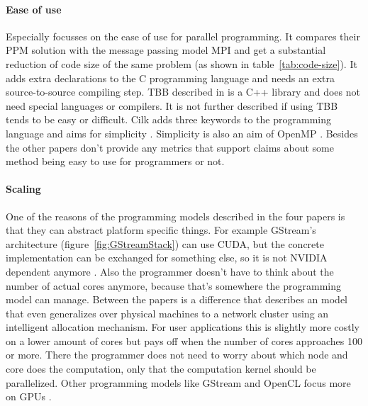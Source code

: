 \paragraph{Ease of use} Especially \cite{BrightwellParallelPhaseModel} focusses
on the ease of use for parallel programming. It compares their PPM solution
with the message passing model MPI and get a substantial reduction of code size
of the same problem (as shown in table~\ref{tab:code-size}). It adds extra
declarations to the C programming language and needs an extra source-to-source
compiling step. TBB described in
\cite{KimExploitingMultiManyCore,CaoPerformanceAnalysis} is a C++ library and
does not need special languages or compilers. It is not further described if
using TBB tends to be easy or difficult. Cilk adds three keywords to the
programming language and aims for simplicity \cite{KimExploitingMultiManyCore}.
Simplicity is also an aim of OpenMP \cite{KimExploitingMultiManyCore}. Besides
\cite{BrightwellParallelPhaseModel} the other papers don't provide any metrics
that support claims about some method being easy to use for programmers or not.

\paragraph{Scaling} One of the reasons of the programming models
described in the four papers is that they can abstract platform specific
things. For example GStream's architecture (figure~\ref{fig:GStreamStack}) can
use CUDA, but the concrete implementation can be exchanged for something else,
so it is not NVIDIA dependent anymore \cite{ZhangDataParallelProgramming}.
Also the programmer doesn't have to think about the number of actual cores
anymore, because that's somewhere the programming model can manage. Between
the papers is a difference that \cite{BrightwellParallelPhaseModel} describes
an model that even generalizes over physical machines to a network cluster using an intelligent allocation mechanism. For user applications this is slightly more costly on a lower amount of cores but pays off when the number of cores approaches 100 or more. 
There the programmer does not need to worry about which node and core does the
computation, only that the computation kernel should be parallelized. Other
programming models like GStream and OpenCL focus more on GPUs
\cite{KimExploitingMultiManyCore, ZhangDataParallelProgramming}.
